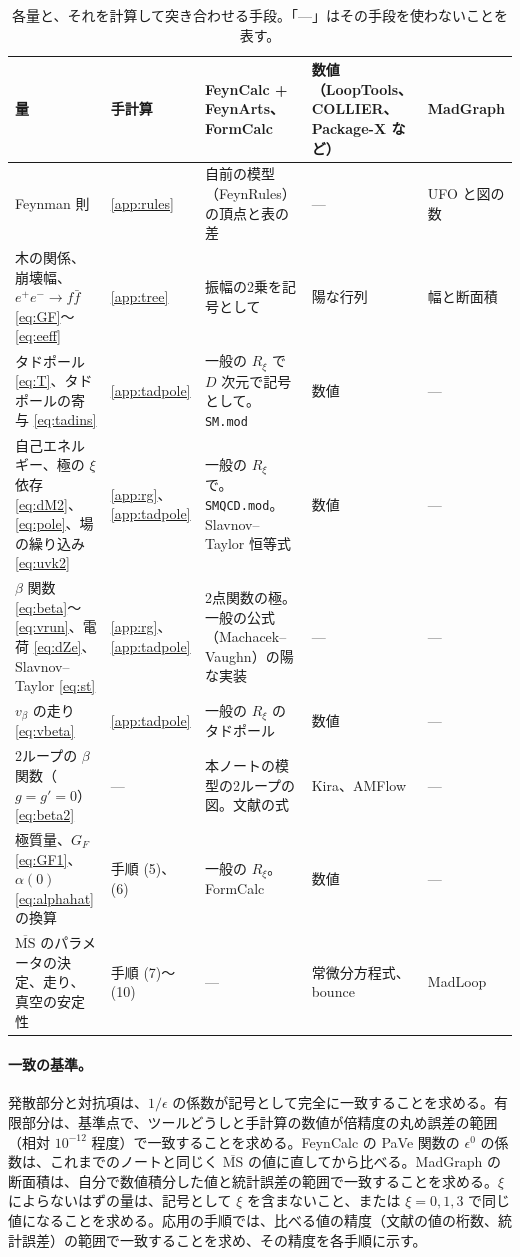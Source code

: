 \documentclass[a4paper,10pt]{ltjsarticle}
\newcommand{\MSbar}{\overline{\mathrm{MS}}}
\begin{document}
\begin{table}[tbp]
\centering\small
\caption{各量と、それを計算して突き合わせる手段。「—」はその手段を使わないことを表す。}
\label{tab:plan}
\begin{tabularx}{\linewidth}{>{\raggedright\arraybackslash}p{3.4cm}>{\raggedright\arraybackslash}p{1.3cm}>{\raggedright\arraybackslash}X>{\raggedright\arraybackslash}p{1.9cm}>{\raggedright\arraybackslash}p{2.1cm}}
\toprule
\textbf{量} & \textbf{手計算} & \textbf{FeynCalc + FeynArts、FormCalc} & \textbf{数値（LoopTools、COLLIER、Package-X など）} & \textbf{MadGraph} \\
\midrule
Feynman 則 & \ref{app:rules} & 自前の模型（FeynRules）の頂点と表の差 & — & UFO と図の数 \\
木の関係、崩壊幅、$e^+e^-\to f\bar f$ \eqref{eq:GF}〜\eqref{eq:eeff} & \ref{app:tree} & 振幅の2乗を記号として & 陽な行列 & 幅と断面積 \\
タドポール \eqref{eq:T}、タドポールの寄与 \eqref{eq:tadins} & \ref{app:tadpole} & 一般の $R_\xi$ で $D$ 次元で記号として。\texttt{SM.mod} & 数値 & — \\
自己エネルギー、極の $\xi$ 依存 \eqref{eq:dM2}、\eqref{eq:pole}、場の繰り込み \eqref{eq:uvk2} & \ref{app:rg}、\ref{app:tadpole} & 一般の $R_\xi$ で。\texttt{SMQCD.mod}。Slavnov--Taylor 恒等式 & 数値 & — \\
$\beta$ 関数 \eqref{eq:beta}〜\eqref{eq:vrun}、電荷 \eqref{eq:dZe}、Slavnov--Taylor \eqref{eq:st} & \ref{app:rg}、\ref{app:tadpole} & 2点関数の極。一般の公式（Machacek--Vaughn）の陽な実装 & — & — \\
$v_\beta$ の走り \eqref{eq:vbeta} & \ref{app:tadpole} & 一般の $R_\xi$ のタドポール & 数値 & — \\
2ループの $\beta$ 関数（$g=g'=0$）\eqref{eq:beta2} & — & 本ノートの模型の2ループの図。文献の式~\cite{buttazzo13} & Kira、AMFlow & — \\
極質量、$G_F$ \eqref{eq:GF1}、$\alpha(0)$ \eqref{eq:alphahat} の換算 & 手順 (5)、(6) & 一般の $R_\xi$。FormCalc & 数値 & — \\
$\MSbar$ のパラメータの決定、走り、真空の安定性 & 手順 (7)〜(10) & — & 常微分方程式、bounce & MadLoop \\
\bottomrule
\end{tabularx}
\end{table}

\paragraph{一致の基準。}発散部分と対抗項は、$1/\epsilon$ の係数が記号として完全に一致することを求める。有限部分は、基準点で、ツールどうしと手計算の数値が倍精度の丸め誤差の範囲（相対 $10^{-12}$ 程度）で一致することを求める。FeynCalc の PaVe 関数の $\epsilon^0$ の係数は、これまでのノートと同じく $\MSbar$ の値に直してから比べる。MadGraph の断面積は、自分で数値積分した値と統計誤差の範囲で一致することを求める。$\xi$ によらないはずの量は、記号として $\xi$ を含まないこと、または $\xi=0,1,3$ で同じ値になることを求める。応用の手順では、比べる値の精度（文献の値の桁数、統計誤差）の範囲で一致することを求め、その精度を各手順に示す。
\end{document}
